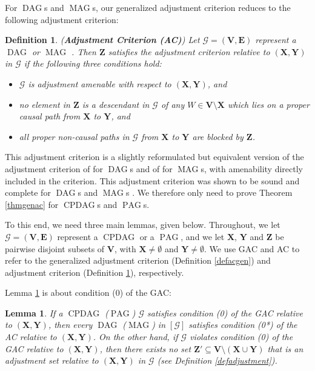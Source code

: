 \documentclass[]{article}
\DeclareMathOperator{\CPDAG}{CPDAG}
\DeclareMathOperator{\DAG}{DAG}
\DeclareMathOperator{\MAG}{MAG}
\DeclareMathOperator{\PAG}{PAG}
\newtheorem{lemma}[theorem]{Lemma}
\newtheorem{definition}[theorem]{Definition}
\theoremstyle{definition}
\theoremstyle{remark}
\newcommand{\vars}[1][V]{\mathbf{#1}}
\newcommand{\e}[1][E]{\mathbf{#1}}
\newcommand{\g}[1][G]{\mathcal{#1}}
\begin{document}
For $\DAG$s and $\MAG$s, our generalized adjustment criterion reduces to the following adjustment criterion:
\begin{definition}{(\textbf{Adjustment Criterion (AC)})}
   Let $\g = (\vars,\e)$ represent a $\DAG$ or $\MAG$ . Then $\mathbf{Z}$ satisfies the adjustment criterion
    relative to $(\mathbf{X},\mathbf{Y})$ in $\g$ if the following three conditions hold:
   \begin{itemize}
   \item[(0*)] $\g$ is adjustment amenable with respect to $(\mathbf{X},\mathbf{Y})$, and
   \item[(a)] no element in $\mathbf{Z}$ is a descendant in $\g$ of any $W \in \vars \setminus \mathbf{X}$ which lies on a proper causal path from $\mathbf{X}$ to $\mathbf{Y}$, and
   \item[(b)] all proper non-causal paths in $\g$ from $\mathbf{X}$ to $\mathbf{Y}$ are blocked by $\mathbf{Z}$.
   \end{itemize}
   \label{defac}
\end{definition}
This adjustment criterion is a slightly reformulated but equivalent version of the adjustment criterion of \citet{shpitser2012validity} for $\DAG$s and of \citet{vanconstructing} for $\MAG$s, with amenability directly included in the criterion. This adjustment criterion was shown to be sound and complete for $\DAG$s \citep{shpitser2012validity,shpitser2012avalidity} and $\MAG$s \citep{vanconstructing}. We therefore only need to prove Theorem \ref{thmgenac} for $\CPDAG$s and $\PAG$s.

To this end, we need three main lemmas, given below.
Throughout, we let $\mathcal G=(\vars, \e)$ represent a $\CPDAG$ or a $\PAG$, and we let $\mathbf{X}$, $\mathbf{Y}$ and $\mathbf{Z}$ be pairwise disjoint subsets of $\vars$, with $\mathbf{X}\neq \emptyset$ and $\mathbf{Y}\neq \emptyset$. We use GAC and AC to refer to the generalized adjustment criterion (Definition \ref{defacgen}) and adjustment criterion (Definition \ref{defac}), respectively.

Lemma \ref{lemmaadjamengen} is about condition (0) of the GAC:
\begin{lemma}
    If a $\CPDAG$ ($\PAG$) $\g$ satisfies condition (0) of the GAC relative to $(\mathbf{X},\mathbf{Y})$, then every $\DAG$ ($\MAG$) in $[\g]$ satisfies condition (0*) of the AC relative to $(\mathbf{X},\mathbf{Y})$. On the other hand, if $\g$ violates condition (0) of the GAC relative to $(\mathbf{X},\mathbf{Y})$, then there exists no set $\mathbf{Z}' \subseteq \vars \setminus (\mathbf{X}\cup \mathbf{Y})$ that is an adjustment set relative to $(\mathbf{X},\mathbf{Y})$ in $\g$ (see Definition \ref{defadjustment}).
   \label{lemmaadjamengen}
\end{lemma}
\end{document}
